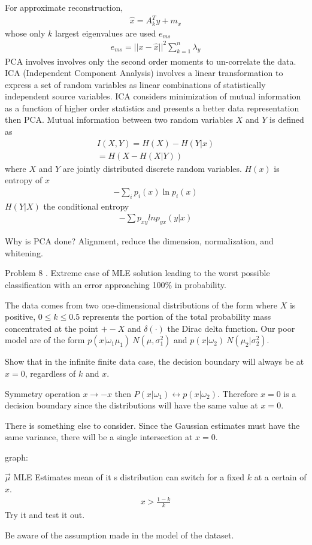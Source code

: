 For approximate reconstruction, 
\begin{eqnarray}
	\hat{x} = A^T _k y + m_x
\end{eqnarray}
whose only $k$ largest eigenvalues are used $e_{ms}$ 
\begin{eqnarray}
	e_{ms} = || x - \hat{x} || ^2 \sum_{k=1}^n \lambda_y
\end{eqnarray}
 PCA involves involves only the second order moments to un-correlate the data. ICA (Independent Component Analysis) involves a linear transformation to express a set of random variables as linear combinations of statistically independent source variables.  ICA considers minimization of mutual information as a function of higher order statistics and presents a better data representation then PCA.  Mutual information between two random variables $X$ and $Y$ is defined as 
\begin{eqnarray}
	I(X,Y)  = H(X) - H(Y|x) \\
	= H(X - H(X|Y))
\end{eqnarray}
where $X$ and $Y$ are jointly distributed discrete random variables.  
$H(x)$ is entropy of $x$ 
\begin{eqnarray}
	- \sum _i p_i (x) \ln p_i (x) 
\end{eqnarray}
$H(Y| X)$ the conditional entropy 
\begin{eqnarray}
	- \sum p_{xy} ln p_{yx} (y| x)
\end{eqnarray}

Why is PCA done?  Alignment, reduce the dimension, normalization, and whitening.  

Problem 8 \cite[142]{duda-hart-stork}.  Extreme case of MLE solution leading to the worst possible classification with an error approaching 100\% in probability.  


The data comes from two one-dimensional distributions of the form 
where $X$ is positive, $ 0 \le k \le 0.5$ represents the portion of the total probability mass concentrated at the point $+- X $ and $\delta(\cdot)$ the Dirac delta function.   Our poor model are of the form $p(x | \omega_1 \mu _1) ~ N( \mu , \sigma_1 ^2)$ and $p(x|\omega_2) ~ N(\mu_2 | \sigma_2 ^2)$.   
\begin{itemize}
	Show that in the infinite finite data case, the decision boundary will always be at $x=0$, regardless of $k$ and $x$.  
	
	Symmetry operation $x\to -x$ then $P(x|\omega_1)\leftrightarrow p(x | \omega_2)$.    Therefore $x=0$ is a decision boundary since the distributions will have the same value at $x=0$.   
	
	There is something else to consider.  Since the Gaussian estimates must have the same variance, there will be a single intersection at $x=0$.  
\end{itemize}

graph:  

$\vec{\mu}$ MLE Estimates mean of it s distribution can switch for a fixed $k$ at a certain of $x$.  
\begin{eqnarray}
	x > \frac{1-k}{k}
\end{eqnarray}
Try it and test it out.  

Be aware of the assumption made in the model of the dataset.  

